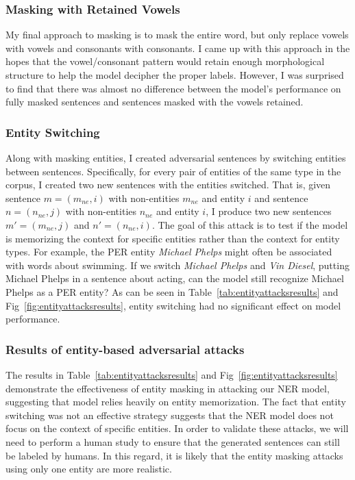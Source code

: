  \subsubsection{Masking with Retained Vowels}
 My final approach to masking is to mask the entire word, but only replace vowels with vowels and consonants with consonants. I came up with this approach in the hopes that the vowel/consonant pattern would retain enough morphological structure to help the model decipher the proper labels. However, I was surprised to find that there was almost no difference between the model's performance on fully masked sentences and sentences masked with the vowels retained.
 
 \subsubsection{Entity Switching}
 Along with masking entities, I created adversarial sentences by switching entities between sentences. Specifically, for every pair of entities of the same type in the corpus, I created two new sentences with the entities switched. That is, given sentence $m = (m_{ne}, i)$ with non-entities $m_{ne}$ and entity $i$ and sentence $n = (n_{ne}, j)$ with non-entities $n_{ne}$ and entity $i$, I produce two new sentences $m' = (m_{ne}, j)$ and $n' = (n_{ne}, i)$. The goal of this attack is to test if the model is memorizing the context for specific entities rather than the context for entity types. For example, the \textsc{PER} entity \textit{Michael Phelps} might often be associated with words about swimming. If we switch \textit{Michael Phelps} and \textit{Vin Diesel}, putting Michael Phelps in a sentence about acting, can the model still recognize Michael Phelps as a \textsc{PER} entity? As can be seen in Table~\ref{tab:entityattacksresults} and Fig~\ref{fig:entityattacksresults}, entity switching had no significant effect on model performance.
 
 \subsubsection{Results of entity-based adversarial attacks}
  The results in Table~\ref{tab:entityattacksresults} and Fig~\ref{fig:entityattacksresults} demonstrate the effectiveness of entity masking in attacking our NER model, suggesting that model relies heavily on entity memorization. The fact that entity switching was not an effective strategy suggests that the NER model does not focus on the context of specific entities. In order to validate these attacks, we will need to perform a human study to ensure that the generated sentences can still be labeled by humans. In this regard, it is likely that the entity masking attacks using only one entity are more realistic.
 

